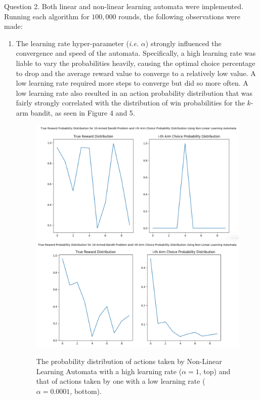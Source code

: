 \documentclass{article}
\begin{document}
	
	
	
Question 2. Both linear and non-linear learning automata were implemented. Running each algorithm for $100,000$ rounds, the following observations were made:
	\begin{enumerate}
	\item The learning rate hyper-parameter (\textit{i.e.} $\alpha$) strongly influenced the convergence and speed of the automata. Specifically, a high learning rate was liable to vary the probabilities heavily, causing the optimal choice percentage to drop and the average reward value to converge to a relatively low value. A low learning rate required more steps to converge but did so more often. A low learning rate also resulted in an action probability distribution that was fairly strongly correlated with the distribution of win probabilities for the $k$-arm bandit, as seen in Figure 4 and 5.
	\begin{figure}[h]
	\centering
	\includegraphics[scale=0.2]{nlla_pred_hlr}
	\includegraphics[scale=0.2]{nlla_pred_llr}
	\caption{The probability distribution of actions taken by Non-Linear Learning Automata with a high learning rate ($\alpha=1$, top) and that of actions taken by one with a low learning rate ($\alpha=0.0001$, bottom).}
	\end{figure}
	

\end{enumerate}
\end{document}
